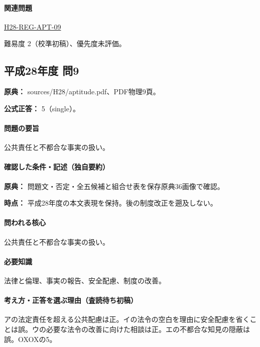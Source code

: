 \paragraph{関連問題} \hyperref[q:h28-reg-apt-09]{H28-REG-APT-09}

\par 難易度 2（校準初稿）、優先度未評価。

\subsection{平成28年度 問9}
\label{q:h28-reg-apt-09}

\noindent\textbf{原典：} sources/H28/aptitude.pdf、PDF物理9頁。

\textbf{公式正答：} 5（single）。

\paragraph{問題の要旨} 公共責任と不都合な事実の扱い。

\paragraph{確認した条件・記述（独自要約）}\mbox{}\par

\noindent\textbf{原典：} 問題文・否定・全五候補と組合せ表を保存原典36画像で確認。\par

\noindent\textbf{時点：} 平成28年度の本文表現を保持。後の制度改正を遡及しない。\par

\paragraph{問われる核心} 公共責任と不都合な事実の扱い。

\paragraph{必要知識} 法律と倫理、事実の報告、安全配慮、制度の改善。

\paragraph{考え方・正答を選ぶ理由（査読待ち初稿）} アの法定責任を超える公共配慮は正。イの法令の空白を理由に安全配慮を省くことは誤。ウの必要な法令の改善に向けた相談は正。エの不都合な知見の隠蔽は誤。OXOXの5。

